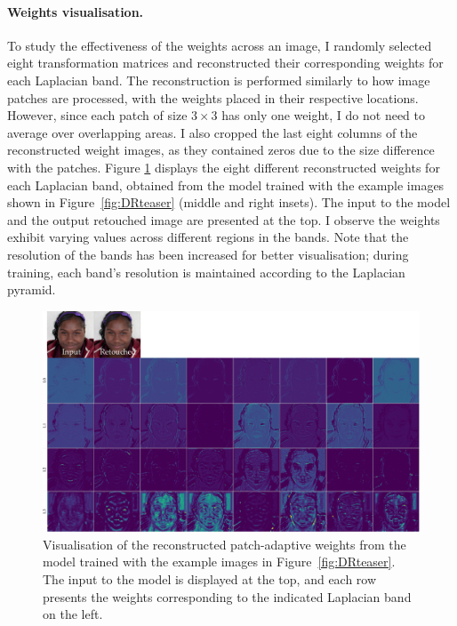 \paragraph{Weights visualisation.} To study the effectiveness of the weights across an image, I randomly selected eight transformation matrices and reconstructed their corresponding weights for each Laplacian band. The reconstruction is performed similarly to how image patches are processed, with the weights placed in their respective locations. However, since each patch of size $3 \times 3$ has only one weight, I do not need to average over overlapping areas. I also cropped the last eight columns of the reconstructed weight images, as they contained zeros due to the size difference with the patches. Figure \ref{fig:weight-vis} displays the eight different reconstructed weights for each Laplacian band, obtained from the model trained with the example images shown in Figure~\ref{fig:DRteaser} (middle and right insets). The input to the model and the output retouched image are presented at the top. I observe the weights exhibit varying values across different regions in the bands. Note that the resolution of the bands has been increased for better visualisation; during training, each band’s resolution is maintained according to the Laplacian pyramid.


\begin{figure}%
\centering
\includegraphics[width=\columnwidth]{Chapters/detail-retouching-figs/weight_visualise.pdf}
    \caption{Visualisation of the reconstructed patch-adaptive weights from the model trained with the example images in Figure~\ref{fig:DRteaser}. The input to the model is displayed at the top, and each row presents the weights corresponding to the indicated Laplacian band on the left.}

\label{fig:weight-vis}
\end{figure}

